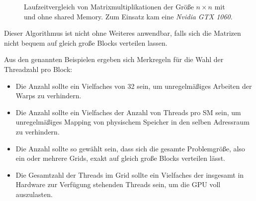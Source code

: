         \begin{figure}[h]
  		\centering
  		\caption[Matrixmultiplikation shared Memory]{Laufzeitvergleich von Matrixmultiplikationen der Größe $n\times n$ mit und ohne shared Memory. Zum Einsatz kam eine \textit{Nvidia GTX 1060}.}
  		\label{fig3:matmul}
		\end{figure}
        
        Dieser Algorithmus ist nicht ohne Weiteres anwendbar, falls sich die Matrizen nicht bequem auf gleich große \Glspl{Block} verteilen lassen.
        
        Aus den genannten Beispielen ergeben sich Merkregeln für die Wahl der \Gls{Thread}zahl pro \Gls{Block}:
        \begin{itemize}
            	\item Die Anzahl sollte ein Vielfaches von 32 sein, um unregelmäßiges Arbeiten der \Glspl{Warp} zu verhindern.
            	\item Die Anzahl sollte ein Vielfaches der Anzahl von \Glspl{Thread} pro \Gls{SM} sein, um unregelmäßiges Mapping von physischem Speicher in den selben Adressraum zu verhindern.
            	\item Die Anzahl sollte so gewählt sein, dass sich die gesamte Problemgröße, also ein oder mehrere \Glspl{Grid}, exakt auf gleich große \Glspl{Block} verteilen lässt.
            	\item Die Gesamtzahl der \Glspl{Thread} im \Gls{Grid} sollte ein Vielfaches der insgesamt in Hardware zur Verfügung stehenden \Glspl{Thread} sein, um die GPU voll auszulasten.
        \end{itemize}
        
